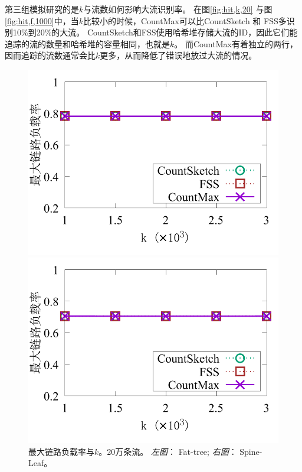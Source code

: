 第三组模拟研究的是$k$与流数如何影响大流识别率。
在图\ref{fig:hit,k,20} 与图 \ref{fig:hit,f,1000}中，当$k$比较小的时候，CountMax可以比CountSketch 和 FSS多识别10\%到20\%的大流。
CountSketch和FSS使用哈希堆存储大流的ID，因此它们能追踪的流的数量和哈希堆的容量相同，也就是$k$。
而CountMax有着独立的两行，因而追踪的流数通常会比$k$更多，从而降低了错误地放过大流的情况。



\begin{figure}[ht]
	\centering
	\begin{minipage}[t]{0.49\linewidth}
		\centering
		\includegraphics[width=\linewidth]{fig/ft_k_load_200000.pdf}
	\end{minipage}\vspace{-0.6em}%
	\begin{minipage}[t]{0.49\linewidth}
		\centering
		\includegraphics[width=\linewidth]{fig/hy_k_load_200000.pdf}
	\end{minipage}\vspace{-0.6em}
	\caption{\textnormal{最大链路负载率与$k$。20万条流。 \textit{左图}： Fat-tree; \textit{右图}： Spine-Leaf。}}
	\label{fig:load,k}
\end{figure}


